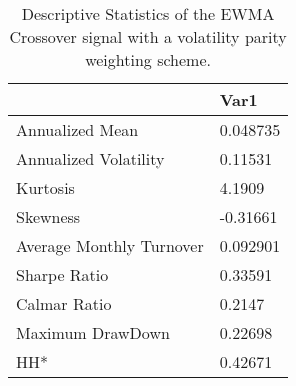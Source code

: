 \begin{table}[H]
\centering
\begin{tabular}{ll}
& Var1 \\ 
\hline 
Annualized Mean & 0.048735 \\ 
Annualized Volatility & 0.11531 \\ 
Kurtosis & 4.1909 \\ 
Skewness & -0.31661 \\ 
Average Monthly Turnover & 0.092901 \\ 
Sharpe Ratio & 0.33591 \\ 
Calmar Ratio & 0.2147 \\ 
Maximum DrawDown & 0.22698 \\ 
HH* & 0.42671 \\ 
\hline
\end{tabular}
\caption{Descriptive Statistics of the EWMA Crossover signal with a volatility parity weighting scheme.}
\label{MBBSVPOQ}
\end{table}